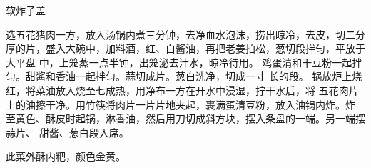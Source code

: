 \begin{recipe}{软炸子盖}

\ingredients


\cooking

\step 选五花猪肉一方，放入汤锅内煮三分钟，去净血水泡沫，捞出晾冷，去皮，切二分
厚的片，盛入大碗中，加料酒，红、白酱油，再把老姜拍松，葱切段拌匀，平放于大平盘
中，上笼蒸一点半钟，出笼泌去汁水，晾冷待用。
\step 鸡蛋清和干豆粉一起拌匀。甜酱和香油一起拌匀。蒜切成片。葱白洗净，切成一寸
长的段。
\step 锅放炉上烧红，将菜油放入烧至七成热，用净布一方在开水中浸湿，拧干水后，将
五花肉片上的油擦干净。用竹筷将肉片一片片地夹起，裹满蛋清豆粉，放入油锅内炸。炸
至黄色、酥皮时起锅，淋香油，然后用刀切成斜方块，摆入条盘的一端。另一端摆蒜片、
甜酱、葱白段入席。

\notes

此菜外酥内粑，颜色金黄。

\end{recipe}

